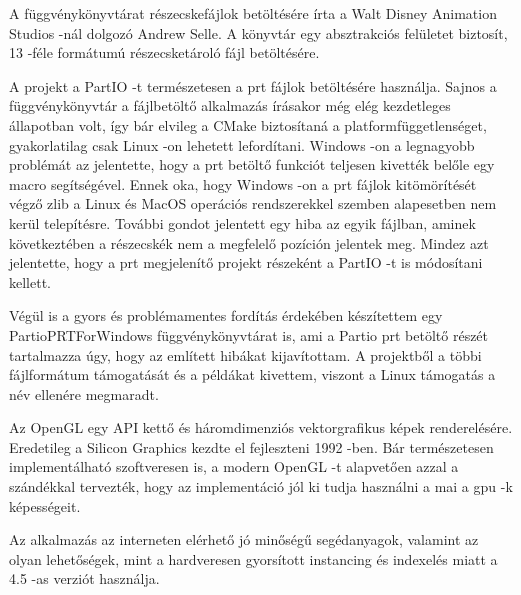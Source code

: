 \vspace{3mm}


\vspace{2mm}

\noindent A függvénykönyvtárat részecskefájlok betöltésére írta 
a Walt Disney Animation Studios -nál dolgozó Andrew Selle. 
A könyvtár egy absztrakciós felületet biztosít, 
13 -féle formátumú részecsketároló fájl betöltésére.

A projekt a PartIO -t természetesen a prt fájlok betöltésére használja. 
Sajnos a függvénykönyvtár a fájlbetöltő alkalmazás írásakor még 
elég kezdetleges állapotban volt, 
így bár elvileg a CMake biztosítaná a platformfüggetlenséget, 
gyakorlatilag csak Linux -on lehetett lefordítani.
Windows -on a legnagyobb problémát az jelentette, 
hogy a prt betöltő funkciót teljesen kivették belőle 
egy macro segítségével. 
Ennek oka, hogy Windows -on a prt fájlok kitömörítését végző 
zlib a Linux és MacOS operációs rendszerekkel szemben 
alapesetben nem kerül telepítésre. 
További gondot jelentett egy hiba az egyik fájlban, 
aminek következtében a részecskék 
nem a megfelelő pozíción jelentek meg. 
Mindez azt jelentette, 
hogy a prt megjelenítő projekt részeként 
a PartIO -t is módosítani kellett. 

Végül is a gyors és problémamentes fordítás érdekében 
készítettem egy PartioPRTForWindows függvénykönyvtárat is, 
ami a Partio prt betöltő részét tartalmazza úgy, 
hogy az említett hibákat kijavítottam. 
A projektből a többi fájlformátum támogatását és 
a példákat kivettem, 
viszont a Linux támogatás a név ellenére megmaradt.

\vspace{3mm}


\vspace{3mm}

Az OpenGL egy API kettő és háromdimenziós vektorgrafikus képek renderelésére. 
Eredetileg a Silicon Graphics kezdte el fejleszteni 1992 -ben. 
Bár természetesen implementálható szoftveresen is, 
a modern OpenGL -t alapvetően azzal a szándékkal tervezték, 
hogy az implementáció jól ki tudja használni a mai a gpu -k képességeit.
 
Az alkalmazás az interneten elérhető jó minőségű segédanyagok, 
valamint az olyan lehetőségek, 
mint a hardveresen gyorsított instancing 
és indexelés miatt a 4.5 -as verziót használja.

